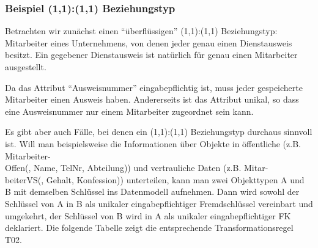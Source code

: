 \subsubsection{Beispiel (1,1):(1,1) Beziehungstyp}
Betrachten wir zunächst einen \enquote{überflüssigen} (1,1):(1,1) Beziehungstyp: Mitarbeiter eines Unternehmens, von denen jeder genau einen Dienstausweis besitzt. Ein gegebener Dienstausweis ist natürlich für genau einen Mitarbeiter ausgestellt.

Da das Attribut \enquote{Ausweisnummer} eingabepflichtig ist, muss jeder gespeicherte Mitarbeiter einen Ausweis haben. Andererseits ist das Attribut unikal, so dass eine Ausweisnummer nur einem Mitarbeiter zugeordnet sein kann.

Es gibt aber auch Fälle, bei denen ein (1,1):(1,1) Beziehungstyp durchaus sinnvoll ist. Will man beispielsweise die Informationen über Objekte in öffentliche (z.B. Mitarbeiter-\\Offen(, Name, TelNr, Abteilung)) und vertrauliche Daten (z.B. Mitar-\\beiterVS(, Gehalt, Konfession)) unterteilen, kann man zwei Objekttypen A und B mit demselben Schlüssel  ins Datenmodell aufnehmen. Dann wird sowohl der Schlüssel  von A in B als unikaler eingabepflichtiger Fremdschlüssel vereinbart und umgekehrt, der Schlüssel  von B wird in A als unikaler eingabepflichtiger FK deklariert. Die folgende Tabelle zeigt die entsprechende Transformationsregel T02.
\clearpage
